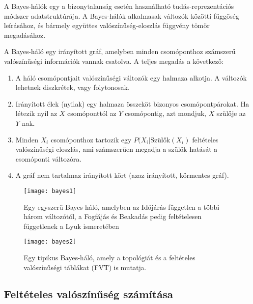 \begin{definicio}
    A Bayes-hálók egy a bizonytalanság esetén használható tudás-reprezentációs
    módszer adatstruktúrája. A Bayes-hálók alkalmasak változók közötti függőség
    leírásához, és bármely együttes valószínűség-eloszlás függvény tömör
    megadásához.

    A Bayes-háló egy irányított gráf, amelyben minden csomóponthoz számszerű
    valószínűségi információk vannak csatolva. A teljes megadás a következő:

    \begin{enumerate}
        \item A háló csomópontjait valószínűségi változók egy halmaza alkotja.
            A változók lehetnek diszkrétek, vagy folytonosak.
        \item Irányított élek (nyilak) egy halmaza összeköt bizonyos
            csomópontpárokat. Ha létezik nyíl az $X$ csomóponttól
            az $Y$ csomópontig, azt mondjuk, $X$ szülője az $Y$-nak.
        \item Minden $X_i$ csomóponthoz tartozik egy $P(X_i|\text{Szülők}(X_i)$
            feltételes valószínűségi eloszlás, ami számszerűen megadja a szülők
            hatását a csomóponti változóra.
        \item A gráf nem tartalmaz irányított kört (azaz irányított, körmentes
            gráf).
    \end{enumerate}

    \begin{figure}[H]
        \centering
        \texttt{[image: bayes1]}
        \caption{Egy egyszerű Bayes-háló, amelyben az Időjárás független a
            többi három változótól, a Fogfájás és Beakadás pedig feltételesen
            függetlenek a Lyuk ismeretében}
        \label{fig:bayes1}
    \end{figure}

    \begin{figure}[H]
        \centering
        \texttt{[image: bayes2]}
        \caption{Egy tipikus Bayes-háló, amely a topológiát és a
            feltételes valószínűségi táblákat (FVT) is mutatja.}
        \label{fig:bayes2}
    \end{figure}
\end{definicio}

\subsection{Feltételes valószínűség számítása}

